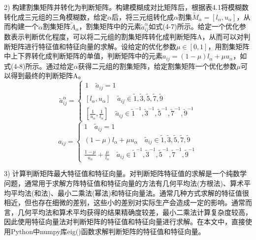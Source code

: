 2) 构建割集矩阵并转化为判断矩阵。构建模糊成对比矩阵后，根据表4.1将模糊数转化成三元组的三角模糊数，给定$\alpha$后，将三元组转化成$\alpha$割集\begin{math}\widetilde{M}_{\alpha}=[l_{\alpha},u_{\alpha}]\end{math}，从而构建一个$\alpha$割集矩阵$\widetilde{A}_{\alpha}$，割集矩阵中的元素$\widetilde{a}_{ij}^{\alpha}$如式(4-7)所示。给定一个优化参数表示判断优化程度，可以将二元组的割集矩阵转化成判断矩阵A，从而可以对判断矩阵进行特征值和特征向量的求解。设给定的优化参数$\mu\in[0,1]$，用割集矩阵中上下界转化成判断矩阵的单值，判断矩阵中的元素$a_{ij}=(1-\mu)l_{\alpha}+\mu u_{\alpha}$，如式(4-8)所示。通过给定$\alpha$获得二元组的割集矩阵，给定割集矩阵一个优化参数$\mu$可以得到最终的判断矩阵A。
\begin{equation}
\widetilde{a}_{ij}^{\alpha} = \left\{\begin{array}{l}
1 \quad \widetilde{a}_{ij}=1 \\ [0.2cm]
[l_{\alpha},u_{\alpha}] \quad \widetilde{a}_{ij}\in{\widetilde{1},\widetilde{3},\widetilde{5},\widetilde{7},\widetilde{9}} \\ [0.2cm]
[\frac{1}{u_{\alpha}},\frac{1}{l_{\alpha}}] \quad \widetilde{a}_{ij}\in{\widetilde{1}^{-1},\widetilde{3}^{-1},\widetilde{5}^{-1},\widetilde{7}^{-1},\widetilde{9}^{-1}}
\end{array}\right.
\end{equation}
\begin{equation}
a_{ij} = \left\{\begin{array}{l}
1 \quad \widetilde{a}_{ij}=1 \\ [0.2cm]
(1-\mu)l_{\alpha}+\mu u_{\alpha} \quad \widetilde{a}_{ij}\in{\widetilde{1},\widetilde{3},\widetilde{5},\widetilde{7},\widetilde{9}} \\ [0.2cm]
\frac{1-\mu}{u_{\alpha}}+\frac{\mu}{l_{\alpha}} \quad \widetilde{a}_{ij}\in{\widetilde{1}^{-1},\widetilde{3}^{-1},\widetilde{5}^{-1},\widetilde{7}^{-1},\widetilde{9}^{-1}}
\end{array}\right.
\end{equation}

3) 计算判断矩阵最大特征值和特征向量。对判断矩阵特征值的求解是一个纯数学问题，通常用于求解方阵特征值和特征向量的方法有几何平均法(方根法)、算术平均平均法(和法)、最小二乘法(幂法)和特征向量法。通常几种方式求解的特征值很相近，但也存在细微的差别，这些小的差别对实际生产会造成一定的影响。通常而言，几何平均法和算术平均获得的结果精确度较差，最小二乘法计算复杂度较高，因此使用特征向量法对判断矩阵的特征值和特征向量进行求解。在本文中，直接使用Python中numpy库eig()函数求解判断矩阵的特征值和特征向量。

